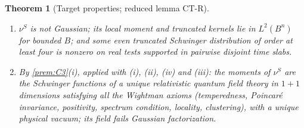\documentclass[11pt]{article}
\theoremstyle{plain}
\newtheorem{theorem}{Theorem}[section]
\theoremstyle{definition}
\theoremstyle{remark}
\begin{document}
\begin{theorem}[Target properties; reduced lemma CT-R]
\begin{enumerate}[label=(\roman*)]
  extension); it is symmetric and real on real tests.
\item $\nu^{S}$ is not Gaussian; its local moment and truncated kernels lie in
  $L^{2}(B^{n})$ for bounded $B$; and some even truncated Schwinger distribution of
  order at least four is nonzero on real tests supported in pairwise disjoint
  time slabs.
\item By \ref{prem:C3}(i), applied with (i), (ii), (iv) and (iii): the moments of
  $\nu^{S}$ are the Schwinger functions of a unique relativistic quantum field theory
  in $1+1$ dimensions satisfying all the Wightman axioms (temperedness,
  Poincar\'e invariance, positivity, spectrum condition, locality, clustering),
  with a unique physical vacuum; its field fails Gaussian factorization.
\end{enumerate}
\end{theorem}
\end{document}
